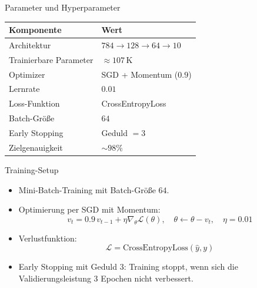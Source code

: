 \documentclass[aspectratio=169]{beamer}
\begin{document}
\begin{frame}{Parameter und Hyperparameter}
  \small
  \begin{table}
    \centering
    \begin{tabular}{@{}ll@{}}
      \toprule
      \textbf{Komponente} & \textbf{Wert} \\
      \midrule
      Architektur & \(784 \rightarrow 128 \rightarrow 64 \rightarrow 10\) \\
      Trainierbare Parameter & \(\approx 107\,\text{K}\) \\
      Optimizer & SGD + Momentum (\(0.9\)) \\
      Lernrate & \(0.01\) \\
      Loss-Funktion & CrossEntropyLoss \\
      Batch-Gr\"o\ss e & \(64\) \\
      Early Stopping & Geduld \(= 3\) \\
      Zielgenauigkeit & \(\sim 98\%\) \\
      \bottomrule
    \end{tabular}
  \end{table}

\end{frame}

\begin{frame}{Training-Setup}
  \begin{itemize}
    \item Mini-Batch-Training mit Batch-Gr\"o\ss e \(64\).
    \item Optimierung per SGD mit Momentum:
    \[
      v_t = 0.9\,v_{t-1} + \eta \nabla_{\theta}\mathcal{L}(\theta),
      \quad \theta \leftarrow \theta - v_t,
      \quad \eta=0.01
    \]
    \item Verlustfunktion:
    \[
      \mathcal{L} = \text{CrossEntropyLoss}(\hat{y}, y)
    \]
    \item Early Stopping mit Geduld \(3\):
    Training stoppt, wenn sich die Validierungsleistung 3 Epochen nicht verbessert.
  \end{itemize}

\end{frame}
\end{document}

